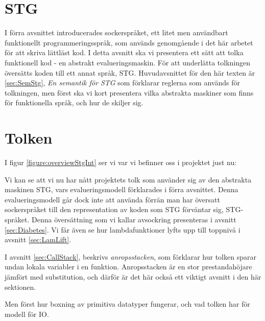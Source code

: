 \documentclass[Rapport]{subfiles}
\begin{document}
\section{STG}
\label{sec:Core}
\label{sec:STG}

\overviewStg

I förra avsnittet introducerades sockerspråket, ett litet men användbart
funktionellt programmeringsspråk, som används genomgående i det här
arbetet för att skriva lättläst kod.
    I detta avsnitt ska vi presentera ett sätt att tolka funktionell kod - 
en abstrakt evalueringsmaskin. För att underlätta
tolkningen översätts koden till ett annat språk, STG. 
Huvudavsnittet för den här texten är \ref{sec:SemStg}, \emph{En semantik för STG}
som förklarar reglerna som används för tolkningen, men först ska vi kort presentera
vilka abstrakta maskiner som finns för funktionella språk, och hur de skiljer sig.






\section{Tolken}
\label{sec:Tolken}

I figur \ref{figure:overviewStgInt} ser vi var vi befinner oss i projektet just nu:

\overviewStgInt

Vi kan se att vi nu har nått projektets tolk som använder sig av den abstrakta maskinen STG, vars
evalueringsmodell förklarades i förra avsnittet. Denna evalueringsmodell går
dock inte att använda förrän man har översatt
sockerspråket till den representation av koden som STG förväntar sig, STG-språket.
Denna översättning som vi kallar avsockring presenteras i avsnitt \ref{sec:Diabetes}.
Vi får även se hur lambdafunktioner lyfts upp till toppnivå i avsnitt \ref{sec:LamLift}.

I avsnitt \ref{sec:CallStack}, beskrivs \emph{anropsstacken}, som förklarar hur tolken
sparar undan lokala variabler i en funktion. Anropsstacken är en 
stor prestandahöjare jämfört med substitution, och därför är det här också ett
viktigt avsnitt i den här sektionen.

Men först hur boxning av primitiva datatyper fungerar, och vad tolken har
för modell för IO.






\end{document}
